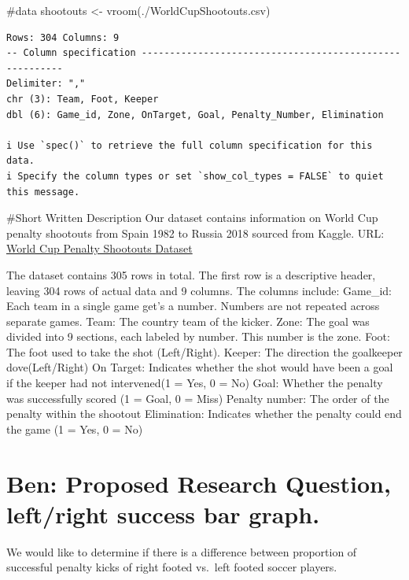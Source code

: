 \documentclass[
  letterpaper,
  DIV=11,
  numbers=noendperiod]{scrartcl}
\newenvironment{Shaded}{\begin{snugshade}}{\end{snugshade}}
\newcommand{\CommentTok}[1]{\textcolor[rgb]{0.37,0.37,0.37}{#1}}
\newcommand{\FunctionTok}[1]{\textcolor[rgb]{0.28,0.35,0.67}{#1}}
\newcommand{\NormalTok}[1]{\textcolor[rgb]{0.00,0.23,0.31}{#1}}
\newcommand{\OtherTok}[1]{\textcolor[rgb]{0.00,0.23,0.31}{#1}}
\newcommand{\StringTok}[1]{\textcolor[rgb]{0.13,0.47,0.30}{#1}}
\begin{document}
\begin{Shaded}
\begin{Highlighting}[]
\CommentTok{\#data}
\NormalTok{shootouts }\OtherTok{\textless{}{-}} \FunctionTok{vroom}\NormalTok{(}\StringTok{\textquotesingle{}./WorldCupShootouts.csv\textquotesingle{}}\NormalTok{)}
\end{Highlighting}
\end{Shaded}

\begin{verbatim}
Rows: 304 Columns: 9
-- Column specification --------------------------------------------------------
Delimiter: ","
chr (3): Team, Foot, Keeper
dbl (6): Game_id, Zone, OnTarget, Goal, Penalty_Number, Elimination

i Use `spec()` to retrieve the full column specification for this data.
i Specify the column types or set `show_col_types = FALSE` to quiet this message.
\end{verbatim}

\#Short Written Description Our dataset contains information on World
Cup penalty shootouts from Spain 1982 to Russia 2018 sourced from
Kaggle. URL:
\href{https://www.kaggle.com/datasets/pablollanderos33/world-cup-penalty-shootouts}{World
Cup Penalty Shootouts Dataset}

The dataset contains 305 rows in total. The first row is a descriptive
header, leaving 304 rows of actual data and 9 columns. The columns
include: Game\_id: Each team in a single game get's a number. Numbers
are not repeated across separate games. Team: The country team of the
kicker. Zone: The goal was divided into 9 sections, each labeled by
number. This number is the zone. Foot: The foot used to take the shot
(Left/Right). Keeper: The direction the goalkeeper dove(Left/Right) On
Target: Indicates whether the shot would have been a goal if the keeper
had not intervened(1 = Yes, 0 = No) Goal: Whether the penalty was
successfully scored (1 = Goal, 0 = Miss) Penalty number: The order of
the penalty within the shootout Elimination: Indicates whether the
penalty could end the game (1 = Yes, 0 = No)

\section{Ben: Proposed Research Question, left/right success bar
graph.}\label{ben-proposed-research-question-leftright-success-bar-graph.}

We would like to determine if there is a difference between proportion
of successful penalty kicks of right footed vs.~left footed soccer
players.
\end{document}
